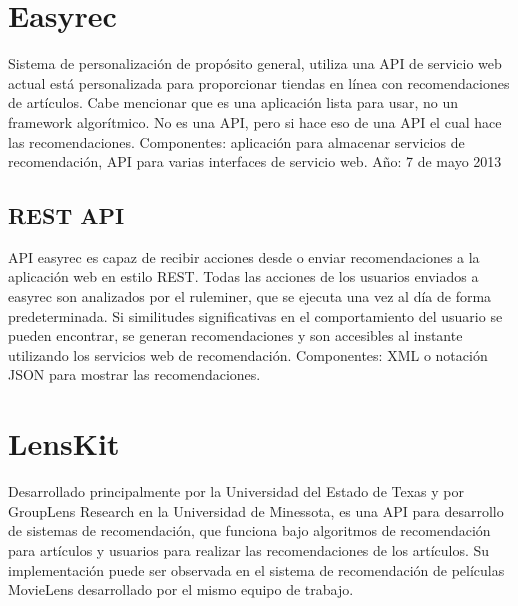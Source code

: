   \section{Easyrec}
    Sistema de personalización de propósito general, utiliza una API de servicio web actual está personalizada para proporcionar tiendas en línea con recomendaciones de artículos. Cabe mencionar que es una aplicación lista para usar, no un framework algorítmico. No es una API, pero si hace eso de una API el cual hace las recomendaciones. Componentes: aplicación para almacenar servicios de recomendación, API para varias interfaces de servicio web. Año: 7 de mayo 2013\cite{7}

    \subsection{REST API}
      API easyrec es capaz de recibir acciones desde o enviar recomendaciones a la aplicación web en estilo REST. Todas las acciones de los usuarios enviados a easyrec son analizados por el ruleminer, que se ejecuta una vez al día de forma predeterminada. Si similitudes significativas en el comportamiento del usuario se pueden encontrar, se generan recomendaciones y son accesibles al instante utilizando los servicios web de recomendación. Componentes: XML o notación JSON para mostrar las recomendaciones. \cite{8}

  \section{LensKit}
    Desarrollado principalmente por la Universidad del Estado de Texas y por GroupLens Research en la Universidad de Minessota, es una API para desarrollo de sistemas de recomendación, que funciona bajo algoritmos de recomendación para artículos y usuarios para realizar las recomendaciones de los artículos. Su implementación puede ser observada en el sistema de recomendación de películas MovieLens desarrollado por el mismo equipo de trabajo. \cite{9}
    
